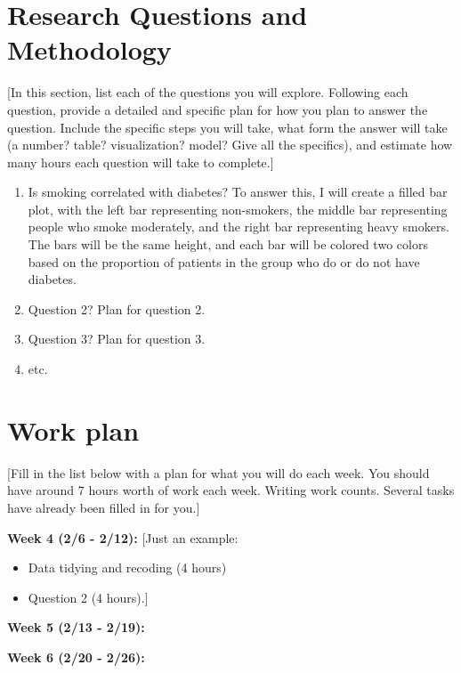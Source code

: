 \documentclass[
  letterpaper,
  DIV=11,
  numbers=noendperiod]{scrartcl}
\providecommand{\tightlist}{%
  \setlength{\itemsep}{0pt}\setlength{\parskip}{0pt}}\usepackage{longtable,booktabs,array}
\begin{document}
\hypertarget{research-questions-and-methodology}{%
\section{Research Questions and
Methodology}\label{research-questions-and-methodology}}

{[}In this section, list each of the questions you will explore.
Following each question, provide a detailed and specific plan for how
you plan to answer the question. Include the specific steps you will
take, what form the answer will take (a number? table? visualization?
model? Give all the specifics), and estimate how many hours each
question will take to complete.{]}

\begin{enumerate}
\def\labelenumi{\arabic{enumi}.}
\item
  Is smoking correlated with diabetes? To answer this, I will create a
  filled bar plot, with the left bar representing non-smokers, the
  middle bar representing people who smoke moderately, and the right bar
  representing heavy smokers. The bars will be the same height, and each
  bar will be colored two colors based on the proportion of patients in
  the group who do or do not have diabetes.
\item
  Question 2? Plan for question 2.
\item
  Question 3? Plan for question 3.
\item
  etc.
\end{enumerate}

\hypertarget{work-plan}{%
\section{Work plan}\label{work-plan}}

{[}Fill in the list below with a plan for what you will do each week.
You should have around 7 hours worth of work each week. Writing work
counts. Several tasks have already been filled in for you.{]}

\textbf{Week 4 (2/6 - 2/12):} {[}Just an example:

\begin{itemize}
\tightlist
\item
  Data tidying and recoding (4 hours)
\item
  Question 2 (4 hours).{]}
\end{itemize}

\textbf{Week 5 (2/13 - 2/19):}

\textbf{Week 6 (2/20 - 2/26):}
\end{document}
